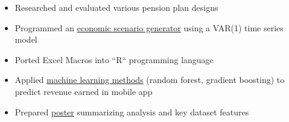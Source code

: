 \documentclass[12pt,a4paper]{altacv}
\begin{document}
\divider


\divider

\begin{itemize}
\item Researched and evaluated various pension plan designs
\item Programmed an \href{https://github.com/nathanesau/StocVal}{economic scenario generator} using a VAR(1) time series model
\item Ported Excel Macros into ``R`` programming language
\end{itemize}

\divider



\nocite{*}

%
%
%



\begin{itemize}
\item Applied \href{https://github.com/nathanesau/ukencompetition}{machine learning methods} (random forest, gradient boosting) to predict revenue earned in mobile app
\item Prepared \href{https://raw.githubusercontent.com/nathanesau/ukencompetition/master/Poster/poster.pdf}{poster} summarizing analysis and key dataset features
\end{itemize}
\end{document}
